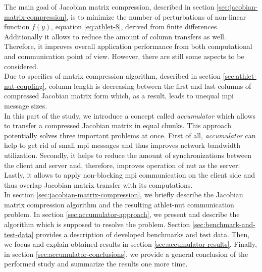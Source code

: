 The main goal of Jacobian matrix compression, described in section \ref{sec:jacobian-matrix-compression}, is to minimize the number of perturbations of non-linear function $f(y)$, equation \ref{eq:athlet-8}, derived from finite differences. Additionally it allows to reduce the amount of column transfers as well. Therefore, it improves overall application performance from both computational and communication point of view. However, there are still some aspects to be considered.\\


Due to specifics of matrix compression algorithm, described in section \ref{sec:athlet-nut-coupling}, column length is decreasing between the first and last columns of compressed Jacobian matrix form which, as a result, leads to unequal \gls{mpi} message sizes.\\


In this part of the study, we introduce a concept called \textit{accumulator} which allows to transfer a compressed Jacobian matrix in equal chunks. This approach potentially solves three important problems at once. First of all, \textit{accumulator} can help to get rid of small \gls{mpi} messages and thus improves network bandwidth utilization. Secondly, it helps to reduce the amount of synchronizations between the client and server and, therefore, improves operation of \gls{nut} as the server. Lastly, it allows to apply non-blocking \gls{mpi} communication on the client side and thus overlap Jacobian matrix transfer with its computations.\\


In section \ref{sec:jacobian-matrix-compression}, we briefly describe the Jacobian matrix compression algorithm and the resulting \gls{athlet}-\gls{nut} communication problem. In section \ref{sec:accumulator-approach}, we present and describe the algorithm which is supposed to resolve the problem. Section \ref{sec:benchmark-and-test-data} provides a description of developed benchmarks and test data. Then, we focus and explain obtained results in section \ref{sec:accumulator-results}. Finally, in section \ref{sec:accumulator-conclusions}, we provide a general conclusion of the performed study and summarize the results one more time.\\

